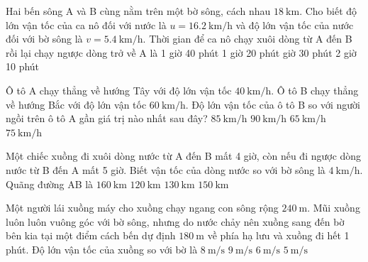 \begin{ex}
Hai bến sông A và B cùng nằm trên một bờ sông, cách nhau $\SI{18}{\kilo\meter}$. Cho biết độ lớn vận tốc của ca nô đối với nước là $u =\SI{16.2}{\kilo\meter/\hour}$ và độ lớn vận tốc của nước đối với bờ sông là $v=\SI{5.4}{\kilo\meter/\hour}$. Thời gian để ca nô chạy xuôi dòng từ A đến B rồi lại chạy ngược dòng trở về A là	
	\choice
	{1 giờ 40 phút}
	{1 giờ 20 phút}
	{ giờ 30 phút}
	{2 giờ 10 phút}
	\loigiai{}
\end{ex}
\begin{ex}
Ô tô A chạy thẳng về hướng Tây với độ lớn vận tốc $\SI{40}{\kilo\meter/\hour}$. Ô tô B chạy thẳng về hướng Bắc với độ lớn vận tốc $\SI{60}{\kilo\meter/\hour}$. Độ lớn vận tốc của ô tô B so với người ngồi trên ô tô A gần giá trị nào nhất sau đây?	
	\choice
	{$\SI{85}{\kilo\meter/\hour}$}
	{$\SI{90}{\kilo\meter/\hour}$}
	{$\SI{65}{\kilo\meter/\hour}$}
	{\True $\SI{75}{\kilo\meter/\hour}$}
	\loigiai{}
\end{ex}
\begin{ex}
	Một chiếc xuồng đi xuôi dòng nước từ A đến B mất 4 giờ, còn nếu đi ngược dòng nước từ B đến A mất 5 giờ. Biết vận tốc của dòng nước so với bờ sông là $\SI{4}{\kilo\meter/\hour}$. Quãng đường AB là
	\choice
	{\True $\SI{160}{\kilo\meter}$}
	{$\SI{120}{\kilo\meter}$}
	{$\SI{130}{\kilo\meter}$}
	{$\SI{150}{\kilo\meter}$}
	\loigiai{}
\end{ex}
\begin{ex}
	Một người lái xuồng máy cho xuồng chạy ngang con sông rộng $\SI{240}{\meter}$. Mũi xuồng luôn luôn vuông góc với bờ sông, nhưng do nước chảy nên xuồng sang đến bờ bên kia tại một điểm cách bến dự định $\SI{180}{\meter}$ về phía hạ lưu và xuồng đi hết 1 phút. Độ lớn vận tốc của xuồng so với bờ là
	\choice
	{$\SI{8}{\meter/\second}$}
	{$\SI{9}{\meter/\second}$}
	{$\SI{6}{\meter/\second}$}
	{\True $\SI{5}{\meter/\second}$}
	\loigiai{}
\end{ex}
